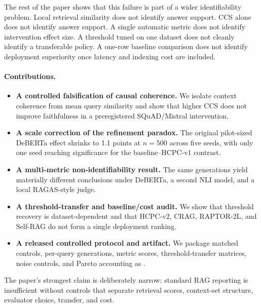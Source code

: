 The rest of the paper shows that this failure is part of a wider
identifiability problem. Local retrieval similarity does not identify answer
support. CCS alone does not identify answer support. A single automatic metric
does not identify intervention effect size. A threshold tuned on one dataset
does not cleanly identify a transferable policy. A one-row baseline comparison
does not identify deployment superiority once latency and indexing cost are
included.

\paragraph{Contributions.}
\begin{itemize}[leftmargin=1.6em,itemsep=2pt,topsep=2pt]
  \item \textbf{A controlled falsification of causal coherence.} We isolate
  context coherence from mean query similarity and show that higher CCS does
  not improve faithfulness in a preregistered SQuAD/Mistral intervention.
  \item \textbf{A scale correction of the refinement paradox.} The original
  pilot-sized DeBERTa effect shrinks to 1.1 points at $n=500$ across five
  seeds, with only one seed reaching significance for the baseline--HCPC-v1
  contrast.
  \item \textbf{A multi-metric non-identifiability result.} The same
  generations yield materially different conclusions under DeBERTa, a second
  NLI model, and a local RAGAS-style judge.
  \item \textbf{A threshold-transfer and baseline/cost audit.} We show that
  threshold recovery is dataset-dependent and that HCPC-v2, CRAG, RAPTOR-2L,
  and Self-RAG do not form a single deployment ranking.
  \item \textbf{A released controlled protocol and artifact.} We package
  matched controls, per-query generations, metric scores, threshold-transfer
  matrices, noise controls, and Pareto accounting as \method.
\end{itemize}

The paper's strongest claim is deliberately narrow: standard RAG reporting is
insufficient without controls that separate retrieval scores, context-set
structure, evaluator choice, transfer, and cost.
